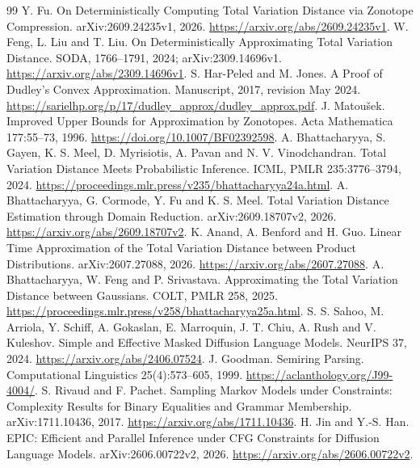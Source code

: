 \documentclass[11pt]{article}
\begin{document}
\begin{thebibliography}{99}
 Y. Fu. On Deterministically Computing Total Variation Distance
via Zonotope Compression. arXiv:2609.24235v1, 2026.
\url{https://arxiv.org/abs/2609.24235v1}.
 W. Feng, L. Liu and T. Liu. On Deterministically Approximating
Total Variation Distance. SODA, 1766--1791, 2024; arXiv:2309.14696v1.
\url{https://arxiv.org/abs/2309.14696v1}.
 S. Har-Peled and M. Jones. A Proof of Dudley's Convex
Approximation. Manuscript, 2017, revision May 2024.
\url{https://sarielhp.org/p/17/dudley_approx/dudley_approx.pdf}.
 J. Matou\v{s}ek. Improved Upper Bounds for Approximation
by Zonotopes. Acta Mathematica 177:55--73, 1996.
\url{https://doi.org/10.1007/BF02392598}.
 A. Bhattacharyya, S. Gayen, K. S. Meel, D. Myrisiotis,
A. Pavan and N. V. Vinodchandran. Total Variation Distance Meets Probabilistic
Inference. ICML, PMLR 235:3776--3794, 2024.
\url{https://proceedings.mlr.press/v235/bhattacharyya24a.html}.
 A. Bhattacharyya, G. Cormode, Y. Fu and K. S. Meel.
Total Variation Distance Estimation through Domain Reduction.
arXiv:2609.18707v2, 2026. \url{https://arxiv.org/abs/2609.18707v2}.
 K. Anand, A. Benford and H. Guo. Linear Time Approximation
of the Total Variation Distance between Product Distributions.
arXiv:2607.27088, 2026. \url{https://arxiv.org/abs/2607.27088}.
 A. Bhattacharyya, W. Feng and P. Srivastava.
Approximating the Total Variation Distance between Gaussians.
COLT, PMLR 258, 2025.
\url{https://proceedings.mlr.press/v258/bhattacharyya25a.html}.
 S. S. Sahoo, M. Arriola, Y. Schiff, A. Gokaslan, E. Marroquin,
J. T. Chiu, A. Rush and V. Kuleshov. Simple and Effective Masked Diffusion
Language Models. NeurIPS 37, 2024. \url{https://arxiv.org/abs/2406.07524}.
 J. Goodman. Semiring Parsing.
Computational Linguistics 25(4):573--605, 1999.
\url{https://aclanthology.org/J99-4004/}.
 S. Rivaud and F. Pachet. Sampling Markov Models under
Constraints: Complexity Results for Binary Equalities and Grammar Membership.
arXiv:1711.10436, 2017. \url{https://arxiv.org/abs/1711.10436}.
 H. Jin and Y.-S. Han. EPIC: Efficient and Parallel Inference
under CFG Constraints for Diffusion Language Models.
arXiv:2606.00722v2, 2026. \url{https://arxiv.org/abs/2606.00722v2}.
\end{thebibliography}
\end{document}
